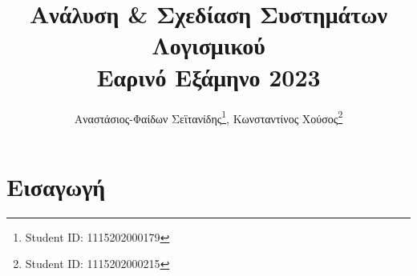 \documentclass[a4paper, titlepage, twoside]{article}
\author{Αναστάσιος-Φαίδων Σεϊτανίδης\thanks{Student ID: 1115202000179}, Κωνσταντίνος Χούσος\thanks{Student ID: 1115202000215}}
\date{}
\title{Ανάλυση \& Σχεδίαση Συστημάτων Λογισμικού\\\medskip
\large Εαρινό Εξάμηνο 2023}
\begin{document}
\maketitle
\tableofcontents


\section{Εισαγωγή}
\label{sec:org017da7d}
\end{document}
